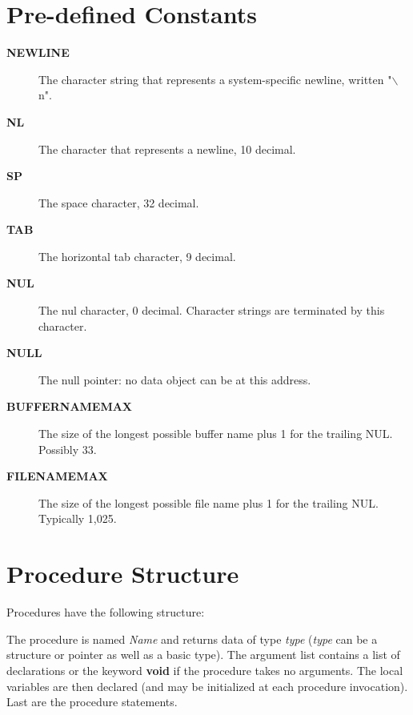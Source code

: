 \section{Pre-defined Constants}
\begin{description} %
\item[{\bf NEWLINE}] The character string that represents a system-specific %
newline, written "$\backslash$n". %
\item[{\bf NL}] The character that represents a newline, 10 decimal. %
\item[{\bf SP}] The space character, 32 decimal. %
\item[{\bf TAB}] The horizontal tab character, 9 decimal. %
\item[{\bf NUL}] The nul character, 0 decimal. Character strings are %
terminated by this character. %
\item[{\bf NULL}] The null pointer: no data object can be at this address. %
\item[{\bf BUFFERNAMEMAX}] The size of the longest possible buffer %
name plus 1 for the trailing NUL. Possibly 33. %
\item[{\bf FILENAMEMAX}] The size of the longest possible file name %
plus 1 for the trailing NUL. Typically 1,025. %
\end{description}
\section{Procedure Structure}
\par
Procedures have the following structure: %
\par
\addvspace{\medskipamount} %
\par
\noindent{\tt %
\footnotesize %
{\it type~Name}(<arguments>)\ \\
\verb_                _\{\ \\
\verb_                _<local~variables>\ \\
\ \\
\verb_                _<statements>\ \\
\verb_                _\} %
} %
\par
\addvspace{\medskipamount} %
\par
The procedure is named {\it Name} and returns data of type {\it type} %
({\it type} can be a structure or pointer as well as a basic type). %
 The argument list contains a list of declarations or the keyword {\bf void} %
if the procedure takes no arguments. The local variables are then declared %
(and may be initialized at each procedure invocation). Last are the %
procedure statements. %

